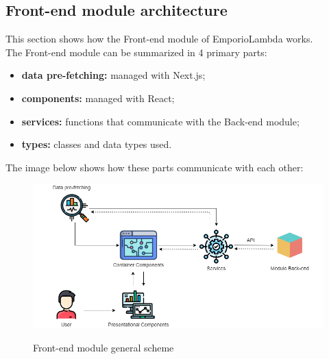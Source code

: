 \subsection{Front-end module architecture}
This section shows how the Front-end module of EmporioLambda works. \\The Front-end module can be summarized in 4 primary parts:
\begin{itemize}
\item \textbf{data pre-fetching:} managed with Next.js;
\item \textbf{components:} managed with React;
\item \textbf{services:} functions that communicate with the Back-end module;
\item \textbf{types:} classes and data types used.
\end{itemize} 
The image below shows how these parts communicate with each other:
\begin{figure}[H]
\centering
\includegraphics[scale=0.58]{res/Architettura/Frontend/img/general_frontend}\\
\caption{Front-end module general scheme}
\end{figure}


